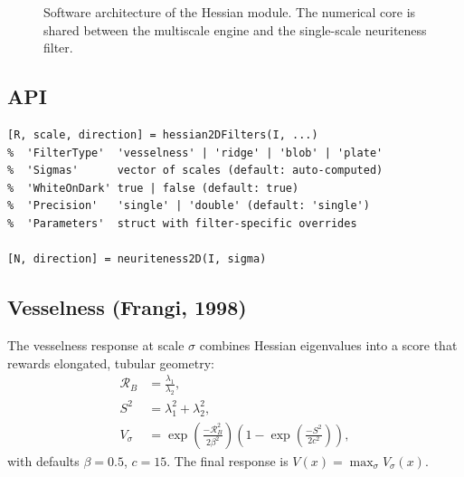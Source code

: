 \documentclass[a4paper,justified]{tufte-book}
\begin{document}
\begin{figure}
  \centering
  \caption{Software architecture of the Hessian module. The numerical core is
  shared between the multiscale engine and the single-scale neuriteness filter.}
\end{figure}

\subsection{API}

\begin{lstlisting}
[R, scale, direction] = hessian2DFilters(I, ...)
%  'FilterType'  'vesselness' | 'ridge' | 'blob' | 'plate'
%  'Sigmas'      vector of scales (default: auto-computed)
%  'WhiteOnDark' true | false (default: true)
%  'Precision'   'single' | 'double' (default: 'single')
%  'Parameters'  struct with filter-specific overrides

[N, direction] = neuriteness2D(I, sigma)
\end{lstlisting}

\subsection{Vesselness (Frangi, 1998)}

The vesselness response at scale $\sigma$ combines Hessian eigenvalues
into a score that rewards elongated, tubular geometry:
\begin{align}
  \mathcal{R}_B &= \frac{\lambda_1}{\lambda_2}, \\
  S^2 &= \lambda_1^2 + \lambda_2^2, \\
  V_\sigma &= \exp\!\left(\frac{-\mathcal{R}_B^2}{2\beta^2}\right)
              \left(1 - \exp\!\left(\frac{-S^2}{2c^2}\right)\right),
\end{align}
with defaults $\beta = 0.5$, $c = 15$. The final response is
$V(x) = \max_{\sigma} V_\sigma(x)$.
\end{document}
